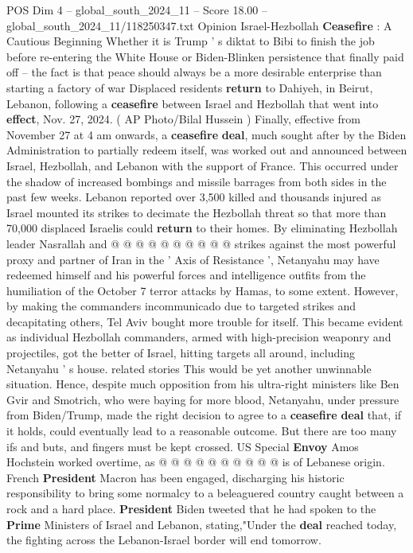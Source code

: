 \begin{textsample}{POS Dim 4 – global\_south\_2024\_11 – Score 18.00 – global\_south\_2024\_11/118250347.txt}  \label{ex:f4_pos_253}
Opinion Israel-Hezbollah \textbf{Ceasefire} : A Cautious Beginning Whether it is Trump ' s diktat to Bibi to finish the job before re-entering the White House or Biden-Blinken persistence that finally paid off -- the fact is that peace should always be a more desirable enterprise than starting a factory of war Displaced residents \textbf{return} to Dahiyeh, in Beirut, Lebanon, following a \textbf{ceasefire} between Israel and Hezbollah that went into \textbf{effect}, Nov. 27, 2024. ( AP Photo/Bilal Hussein ) Finally, effective from November 27 at 4 am onwards, a \textbf{ceasefire} \textbf{deal}, much sought after by the Biden Administration to partially redeem itself, was worked out and announced between Israel, Hezbollah, and Lebanon with the support of France.
This occurred under the shadow of increased bombings and missile barrages from both sides in the past few weeks.
Lebanon reported over 3,500 killed and thousands injured as Israel mounted its strikes to decimate the Hezbollah threat so that more than 70,000 displaced Israelis could \textbf{return} to their homes.
By eliminating Hezbollah leader Nasrallah and @ @ @ @ @ @ @ @ @ @ strikes against the most powerful proxy and partner of Iran in the ' Axis of Resistance ', Netanyahu may have redeemed himself and his powerful forces and intelligence outfits from the humiliation of the October 7 terror attacks by Hamas, to some extent.
However, by making the commanders incommunicado due to targeted strikes and decapitating others, Tel Aviv bought more trouble for itself.
This became evident as individual Hezbollah commanders, armed with high-precision weaponry and projectiles, got the better of Israel, hitting targets all around, including Netanyahu ' s house. related stories This would be yet another unwinnable situation.
Hence, despite much opposition from his ultra-right ministers like Ben Gvir and Smotrich, who were baying for more blood, Netanyahu, under pressure from Biden/Trump, made the right decision to agree to a \textbf{ceasefire} \textbf{deal} that, if it holds, could eventually lead to a reasonable outcome.
But there are too many ifs and buts, and fingers must be kept crossed.
US Special \textbf{Envoy} Amos Hochstein worked overtime, as @ @ @ @ @ @ @ @ @ @ is of Lebanese origin.
French \textbf{President} Macron has been engaged, discharging his historic responsibility to bring some normalcy to a beleaguered country caught between a rock and a hard place. \textbf{President} Biden tweeted that he had spoken to the \textbf{Prime} Ministers of Israel and Lebanon, stating,"Under the \textbf{deal} reached today, the fighting across the Lebanon-Israel border will end tomorrow.

\end{textsample}
